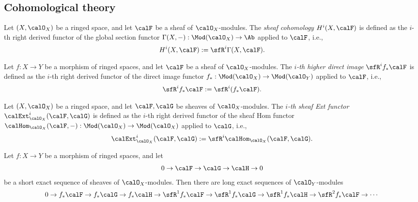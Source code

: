 \subsection{Cohomological theory}

    \begin{definition}\label{def:sheaf_cohomology}
        Let \((X,\calO_X)\) be a ringed space, and let \(\calF\) be a sheaf of \(\calO_X\)-modules.
        The \emph{sheaf cohomology} \(H^i(X,\calF)\) is defined as the \(i\)-th right derived functor of the global section functor \(\Gamma(X,-):\Mod(\calO_X)\to \Ab\) applied to \(\calF\), i.e.,
        \[
            H^i(X,\calF) := \sfR^i\Gamma(X,\calF).
        \]
    \end{definition}

    \begin{definition}\label{def:higher_direct_image}
        Let \(f:X\to Y\) be a morphism of ringed spaces, and let \(\calF\) be a sheaf of \(\calO_X\)-modules.
        The \emph{\(i\)-th higher direct image} \(\sfR^i f_*\calF\) is defined as the \(i\)-th right derived functor of the direct image functor \(f_*:\Mod(\calO_X)\to \Mod(\calO_Y)\) applied to \(\calF\), i.e.,
        \[
            \sfR^i f_*\calF := \sfR^i (f_*\calF).
        \]
    \end{definition}

    \begin{definition}\label{def:sheaf_ext_functor}
        Let \((X,\calO_X)\) be a ringed space, and let \(\calF,\calG\) be sheaves of \(\calO_X\)-modules.
        The \emph{\(i\)-th sheaf Ext functor} \(\calExt^i_{\calO_X}(\calF,\calG)\) is defined as the \(i\)-th right derived functor of the sheaf Hom functor \(\calHom_{\calO_X}(\calF,-):\Mod(\calO_X)\to \Mod(\calO_X)\) applied to \(\calG\), i.e.,
        \[
            \calExt^i_{\calO_X}(\calF,\calG) := \sfR^i \calHom_{\calO_X}(\calF,\calG).
        \]
    \end{definition}

    \begin{proposition}\label{prop:long_exact_sequence_of_cohomology_and_direct_image_associated_to_short_exact_sequence_of_sheaves}
        Let \(f:X\to Y\) be a morphism of ringed spaces, and let
        \[
            0 \to \calF \to \calG \to \calH \to 0
        \]
        be a short exact sequence of sheaves of \(\calO_X\)-modules.
        Then there are long exact sequences of \(\calO_Y\)-modules
        \[
            0 \to f_*\calF \to f_*\calG \to f_*\calH \to \sfR^1 f_*\calF \to \sfR^1 f_*\calG \to \sfR^1 f_*\calH \to \sfR^2 f_*\calF \to \cdots
        \]
    \end{proposition}

